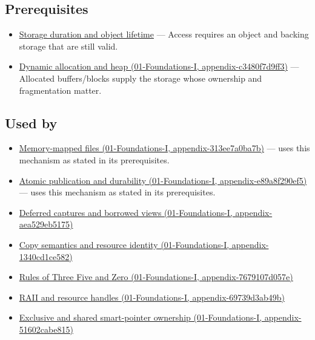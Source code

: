 \subsection{Prerequisites}\label{appendix-d52e4486f527-prerequisites}

\begin{itemize}
\tightlist
\item
  \hyperref[appendix-0b104bcba06b]{Storage duration and object lifetime} --- Access requires an object and backing storage that are still valid.
\item
  \href{../01-Foundations-I/main.pdf\#nameddest=appendix-c3480f7d9ff3}{Dynamic allocation and heap (01-Foundations-I, appendix-c3480f7d9ff3)} --- Allocated buffers/blocks supply the storage whose ownership and fragmentation matter.
\end{itemize}

\subsection{Used by}\label{appendix-d52e4486f527-used-by}

\begin{itemize}
\tightlist
\item
  \href{../01-Foundations-I/main.pdf\#nameddest=appendix-313ee7a0ba7b}{Memory-mapped files (01-Foundations-I, appendix-313ee7a0ba7b)} --- uses this mechanism as stated in its prerequisites.
\item
  \href{../01-Foundations-I/main.pdf\#nameddest=appendix-e89a8f290ef5}{Atomic publication and durability (01-Foundations-I, appendix-e89a8f290ef5)} --- uses this mechanism as stated in its prerequisites.
\item
  \href{../01-Foundations-I/main.pdf\#nameddest=appendix-aea529eb5175}{Deferred captures and borrowed views (01-Foundations-I, appendix-aea529eb5175)}
\item
  \href{../01-Foundations-I/main.pdf\#nameddest=appendix-1340cd1ce582}{Copy semantics and resource identity (01-Foundations-I, appendix-1340cd1ce582)}
\item
  \href{../01-Foundations-I/main.pdf\#nameddest=appendix-7679107d057e}{Rules of Three Five and Zero (01-Foundations-I, appendix-7679107d057e)}
\item
  \href{../01-Foundations-I/main.pdf\#nameddest=appendix-69739d3ab49b}{RAII and resource handles (01-Foundations-I, appendix-69739d3ab49b)}
\item
  \href{../01-Foundations-I/main.pdf\#nameddest=appendix-51602cabe815}{Exclusive and shared smart-pointer ownership (01-Foundations-I, appendix-51602cabe815)}
\end{itemize}

